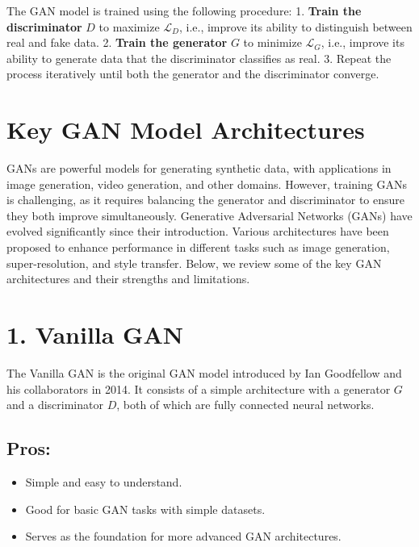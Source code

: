 \documentclass[
]{book}
\providecommand{\tightlist}{%
  \setlength{\itemsep}{0pt}\setlength{\parskip}{0pt}}
\begin{document}
The GAN model is trained using the following procedure:
1. \textbf{Train the discriminator} \(D\) to maximize \(\mathcal{L}_D\), i.e., improve its ability to distinguish between real and fake data.
2. \textbf{Train the generator} \(G\) to minimize \(\mathcal{L}_G\), i.e., improve its ability to generate data that the discriminator classifies as real.
3. Repeat the process iteratively until both the generator and the discriminator converge.

\section{Key GAN Model Architectures}\label{key-gan-model-architectures}

GANs are powerful models for generating synthetic data, with applications in image generation, video generation, and other domains. However, training GANs is challenging, as it requires balancing the generator and discriminator to ensure they both improve simultaneously. Generative Adversarial Networks (GANs) have evolved significantly since their introduction. Various architectures have been proposed to enhance performance in different tasks such as image generation, super-resolution, and style transfer. Below, we review some of the key GAN architectures and their strengths and limitations.

\section{1. Vanilla GAN}\label{vanilla-gan}

The Vanilla GAN is the original GAN model introduced by Ian Goodfellow and his collaborators in 2014. It consists of a simple architecture with a generator \(G\) and a discriminator \(D\), both of which are fully connected neural networks.

\subsection{Pros:}\label{pros}

\begin{itemize}
\tightlist
\item
  Simple and easy to understand.
\item
  Good for basic GAN tasks with simple datasets.
\item
  Serves as the foundation for more advanced GAN architectures.
\end{itemize}
\end{document}
